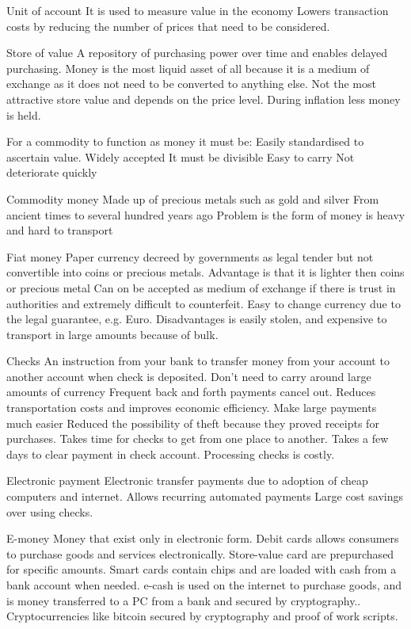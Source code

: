 \documentclass[12pt]{examnotes}
\begin{document}
 Unit of account 
\rna It is used to measure value in the economy
\rna Lowers transaction costs by reducing the number of prices that need to be considered.

 Store of value
\rna A repository of purchasing power over time and enables delayed purchasing.
\rna Money is the most liquid asset of all because it is a medium of exchange as it does not need to be converted to anything else.
\rna Not the most attractive store value and depends on the price level.
\rna During inflation less money is held.

\vspace{6pt}
\ra For a commodity to function as money it must be:
 Easily standardised to ascertain value.
 Widely accepted
 It must be divisible
 Easy to carry
 Not deteriorate quickly

 Commodity money
\rna Made up of precious metals such as gold and silver
\rna From ancient times to several hundred years ago
\rna Problem is the form of money is heavy and hard to transport
 
 Fiat money
\rna Paper currency decreed by governments as legal tender but not convertible into coins or precious metals.
\rna Advantage is that it is lighter then coins or precious metal
\rna  Can on be accepted as medium of exchange if there is trust in authorities and extremely difficult to counterfeit.
\rna Easy to change currency due to the legal guarantee, e.g. Euro.
\rna Disadvantages is easily stolen, and expensive to transport in large amounts because of bulk.

 Checks
\rna An instruction from your bank to transfer money from your account to another account when check is deposited.
\rna Don't need to carry around large amounts of currency
\rna Frequent back and forth payments cancel out.
\rna Reduces transportation costs and improves economic efficiency.
\rna Make large payments much easier
\rna Reduced the possibility of theft because they proved receipts for purchases.
\rna Takes time for checks to get from one place to another.
\rna Takes a few days to clear payment in check account.
\rna Processing checks is costly.

 Electronic payment
\rna Electronic transfer payments due to adoption of cheap computers and internet.
\rna Allows recurring automated payments
\rna Large cost savings over using checks.

 E-money
\rna Money that exist only in electronic form.
\rna Debit cards allows consumers to purchase goods and services electronically.
\rna Store-value card are prepurchased for specific amounts.
\rna Smart cards contain chips and are loaded with cash from a bank account when needed.
\rna e-cash is used on the internet to purchase goods, and is money transferred to a PC from a bank and secured by cryptography..
\rna Cryptocurrencies like bitcoin secured by cryptography and proof of work scripts. 
\end{document}
